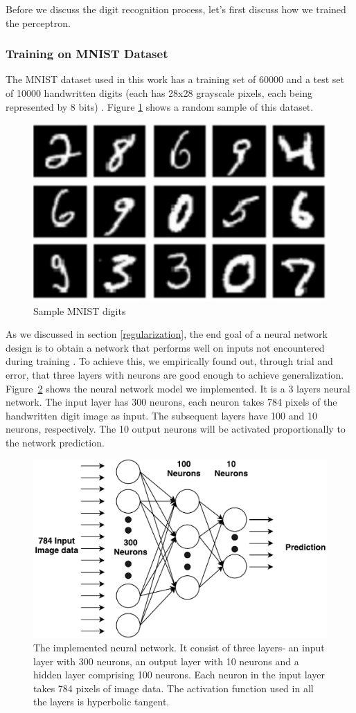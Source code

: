\documentclass[sigconf]{acmart}
\theoremstyle{plain}
\theoremstyle{remark}
\begin{document}
Before we discuss the digit recognition process, let's first discuss how we trained the perceptron.

\subsubsection{Training on  MNIST Dataset}
The MNIST dataset used in this work has a training set of 60000 and a test set of 10000 handwritten digits (each has 28x28 grayscale pixels, each being represented by 8 bits) \cite{726791}. Figure \ref{fig:sampledigit} shows a random sample of this dataset. 

\begin{figure} [hbt]
\centering
\includegraphics[width=0.5\linewidth]{MNIST_sample.pdf}
\caption{Sample MNIST digits}
\label{fig:sampledigit}
\end{figure}

As we discussed in section \ref{regularization}, the end goal of a neural network design is to obtain a network that performs well on inputs not encountered during training \cite{726791}. To achieve this, we empirically found out, through trial and error, that three layers with neurons are good enough to achieve generalization. Figure~\ref{fig:neural_net} shows the neural network model we implemented. It is a 3 layers neural network. The input layer has 300 neurons, each neuron takes 784 pixels of the handwritten digit image as input. The subsequent layers have 100 and 10 neurons, respectively. The 10 output neurons will be activated proportionally to the network prediction. 

\begin{figure} [hbt]
\centering
\includegraphics[width=0.85\linewidth]{neural-network.pdf}
\caption{ The implemented neural network. It consist of three layers- an input layer with 300 neurons, an output layer with 10 neurons and a hidden layer comprising 100 neurons. Each neuron in the input layer takes 784 pixels of image data. The activation function used in all the layers is hyperbolic tangent.}
\label{fig:neural_net}
\end{figure}
\end{document}
